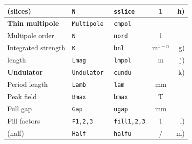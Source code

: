\documentclass[12pt]{article}
\begin{document}
\begin{table}
\begin{tabular}{lllcr}
(slices) & {\tt N} & {\tt sslice} & 1 & h) \\
\hline
{\bf Thin multipole} & {\tt Multipole} & {\tt cmpol} & &  \\
Multipole order & {\tt N} & {\tt nord} & 1 &  \\
Integrated strength & {\tt K} & {\tt bnl} & m$^{1-n}$ &  g) \\
length & {\tt Lmag} & {\tt lmpol} & m & j) \\
\hline
{\bf Undulator} & {\tt Undulator } & {\tt cundu} & &  k)\\
Period length & {\tt Lamb} & {\tt lam} & mm &  \\
Peak field & {\tt Bmax}&  {\tt bmax} & T & \\
Full gap & {\tt Gap} & {\tt ugap} & mm & \\
Fill factors & {\tt F1,2,3} & {\tt fill1,2,3} & 1 & l) \\
(half) & {\tt Half} & {\tt halfu} & -/- & m) \\
\hline
\end{tabular}
\end{table}
\end{document}
